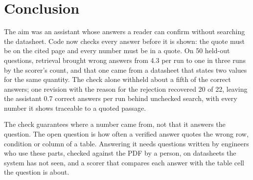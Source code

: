 \section{Conclusion}
\label{sec:conclusion}

The aim was an assistant whose answers a reader can confirm without searching the datasheet. Code now checks every answer before it is shown: the quote must be on the cited page and every number must be in a quote. On 50 held-out questions, retrieval brought wrong answers from 4.3 per run to one in three runs by the scorer's count, and that one came from a datasheet that states two values for the same quantity. The check alone withheld about a fifth of the correct answers; one revision with the reason for the rejection recovered 20 of 22, leaving the assistant 0.7 correct answers per run behind unchecked search, with every number it shows traceable to a quoted passage.

The check guarantees where a number came from, not that it answers the question. The open question is how often a verified answer quotes the wrong row, condition or column of a table. Answering it needs questions written by engineers who use these parts, checked against the PDF by a person, on datasheets the system has not seen, and a scorer that compares each answer with the table cell the question is about.
